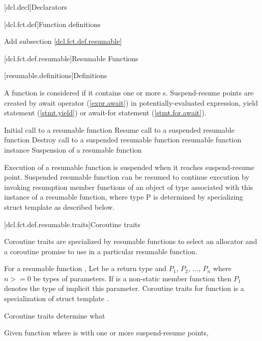 
[dcl.decl]{Declarators}

\setcounter{section}{3}
[dcl.fct.def]{Function definitions}

Add subsection \ref{dcl.fct.def.resumable}

\setcounter{subsection}{3}
[dcl.fct.def.resumable]{Resumable Functions}

[resumable.definitions]{Definitions}

\pnum
A function is considered  if it contains
one or more s. 
Suspend-resume points are created by await operator (\ref{expr.await}) in potentially-evaluated expression, yield statement (\ref{stmt.yield}) 
or await-for statement (\ref{stmt.for.await}).

\pnum
Initial call to a resumable function
Resume call to a suspended resumable function
Destroy call to a suspended resumable function
resumable function instance
\pnum
Suspension of a resumable function 

\pnum
Execution of a resumable function is suspended when it reaches suspend-resume point.
Suspended resumable function can be resumed
to continue execution by invoking
resumption member functions of an object of  type
associated with this instance of a resumable function, where type P
is determined by specializing struct template  as described below. 

[dcl.fct.def.resumable.traits]{Coroutine traits}

\pnum
Coroutine traits are specialized by resumable functions to select an allocator and a coroutine promise to
use in a particular resumable function.

\pnum
For a resumable function , Let  be a return type and $P_1$, $P_2$, ..., $P_n$
where $n >= 0$ be types of parameters. If  is a non-static member function then $P_1$ denotes the type of implicit this parameter. 
Coroutine traits for function  is a specialization of
struct template .

\pnum
Coroutine traits determine what 


\pnum Given function  where  is  with one or more suspend-resume points, 

